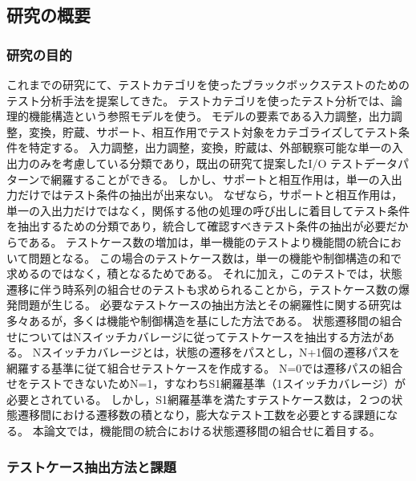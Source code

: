 \documentclass[10pt,a4j]{jarticle}
\begin{document}
\subsection{研究の概要} \label{sec:5-1}
\subsubsection{研究の目的} \label{sec:5-1-1}
これまでの研究にて、テストカテゴリを使ったブラックボックステストのためのテスト分析手法を提案してきた。
テストカテゴリを使ったテスト分析では、論理的機能構造という参照モデルを使う。
モデルの要素である入力調整，出力調整，変換，貯蔵、サポート、相互作用でテスト対象をカテゴライズしてテスト条件を特定する。
入力調整，出力調整，変換，貯蔵は、外部観察可能な単一の入出力のみを考慮している分類であり，既出の研究て提案したI/O テストデータパターンで網羅することができる。
しかし、サポートと相互作用は，単一の入出力だけではテスト条件の抽出が出来ない。
なぜなら，サポートと相互作用は，単一の入出力だけではなく，関係する他の処理の呼び出しに着目してテスト条件を抽出するための分類であり，統合して確認すべきテスト条件の抽出が必要だからである。
テストケース数の増加は，単一機能のテストより機能間の統合において問題となる。
この場合のテストケース数は，単一の機能や制御構造の和で求めるのではなく，積となるためである。
それに加え，このテストでは，状態遷移に伴う時系列の組合せのテストも求められることから，テストケース数の爆発問題が生じる。
必要なテストケースの抽出方法とその網羅性に関する研究は多々あるが，多くは機能や制御構造を基にした方法である\cite{Myers,Lee,Grinda,Ostrand}。
状態遷移間の組合せについてはNスイッチカバレージに従ってテストケースを抽出する方法がある。
Nスイッチカバレージとは，状態の遷移をパスとし，N+1個の遷移パスを網羅する基準に従て組合せテストケースを作成する。
N=0では遷移パスの組合せをテストできないためN=1，すなわちS1網羅基準（1スイッチカバレージ）が必要とされている\cite{Beizer}。
しかし，S1網羅基準を満たすテストケース数は，２つの状態遷移間における遷移数の積となり，膨大なテスト工数を必要とする課題になる。
本論文では，機能間の統合における状態遷移間の組合せに着目する。

\subsubsection{テストケース抽出方法と課題} \label{sec:5-1-2}
\end{document}
